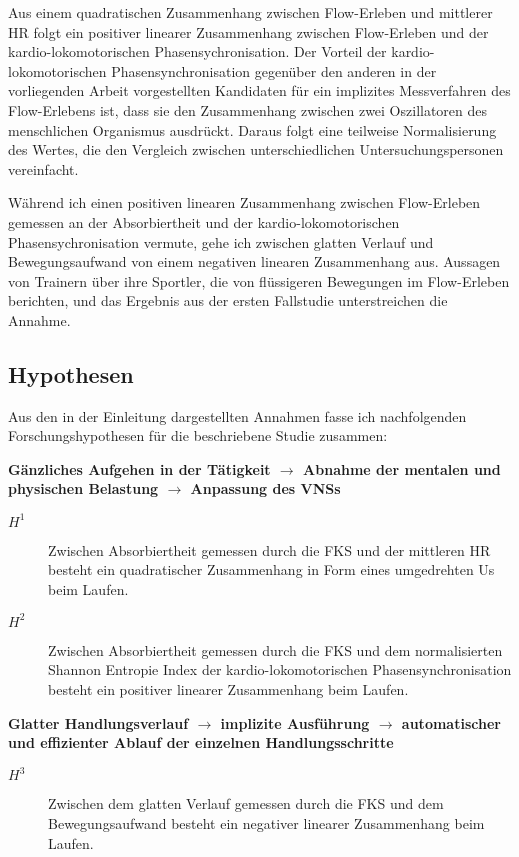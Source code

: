 Aus einem quadratischen Zusammenhang zwischen Flow-Erleben und mittlerer \ac{HR} folgt ein positiver linearer Zusammenhang zwischen Flow-Erleben und der kardio-lokomotorischen Phasensychronisation. Der Vorteil der kardio-lokomotorischen Phasensynchronisation gegenüber den anderen in der vorliegenden Arbeit vorgestellten Kandidaten für ein implizites Messverfahren des Flow-Erlebens ist, dass sie den Zusammenhang zwischen zwei Oszillatoren des menschlichen Organismus ausdrückt. Daraus folgt eine teilweise Normalisierung des Wertes, die den Vergleich zwischen unterschiedlichen Untersuchungspersonen vereinfacht.

Während ich einen positiven linearen Zusammenhang zwischen Flow-Erleben gemessen an der Absorbiertheit und der kardio-lokomotorischen Phasensychronisation vermute, gehe ich zwischen glatten Verlauf und Bewegungsaufwand von einem negativen linearen Zusammenhang aus. Aussagen von Trainern über ihre Sportler, die von flüssigeren Bewegungen im Flow-Erleben berichten, und das Ergebnis aus der ersten Fallstudie unterstreichen die Annahme.

\subsection{Hypothesen}
Aus den in der Einleitung dargestellten Annahmen fasse ich nachfolgenden Forschungshypothesen für die beschriebene Studie zusammen:

\textbf{Gänzliches Aufgehen in der Tätigkeit $\rightarrow$ Abnahme der mentalen und physischen Belastung $\rightarrow$ Anpassung des VNSs}
\begin{description}
	\item[$H^1$] Zwischen Absorbiertheit gemessen durch die \ac{FKS} und der mittleren \ac{HR} besteht ein quadratischer Zusammenhang in Form eines umgedrehten Us beim Laufen.
	\item[$H^2$] Zwischen Absorbiertheit gemessen durch die \ac{FKS} und dem normalisierten Shannon Entropie Index der kardio-lokomotorischen Phasensynchronisation besteht ein positiver linearer Zusammenhang beim Laufen.
\end{description}

\textbf{Glatter Handlungsverlauf $\rightarrow$ implizite Ausführung $\rightarrow$ automatischer und effizienter Ablauf der einzelnen Handlungsschritte} 
\begin{description}
	\item[$H^3$] Zwischen dem glatten Verlauf gemessen durch die \ac{FKS} und dem Bewegungsaufwand besteht ein negativer linearer Zusammenhang beim Laufen.
\end{description}

